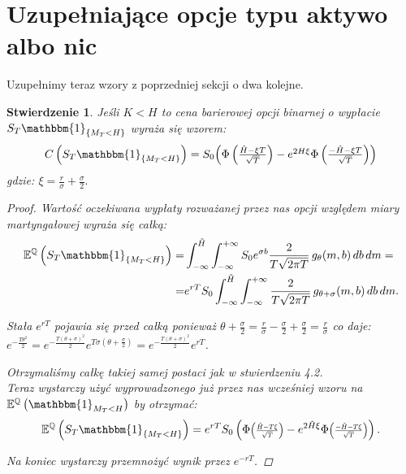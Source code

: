 \documentclass[11pt]{report}
\newtheorem{stw}{Stwierdzenie}[chapter]
\newcommand*{\Scale}[2][4]{\scalebox{#1}{$#2$}}%
\begin{document}
\section{Uzupełniające opcje typu aktywo albo nic}
Uzupełnimy teraz wzory z poprzedniej sekcji o dwa kolejne. 

\begin{stw} Jeśli $K < H$ to cena barierowej opcji binarnej o wypłacie $S_T\mathbbm{1}_{\{ M_T<H \}}$ wyraża się wzorem:
\begin{equation*}
C\left( S_T\mathbbm{1}_{\{ M_T<H \}} \right) = S_0 \Scale[1.0]{ \left(\Phi \left(\frac{ \tilde{H}-\xi T }{\sqrt{T}}\right) - e^{2H\xi}\Phi \left(\frac{ -\tilde{H}-\xi T }{\sqrt{T}}\right)\right) }
\end{equation*} gdzie: $\xi = \frac{r}{\sigma}+\frac{\sigma}{2}.$
\begin{proof}

Wartość oczekiwana wypłaty rozważanej przez nas opcji względem miary martyngałowej wyraża się całką:
\begin{multline*}
\begin{split}
\mathbb{E}^{\mathbb{Q}} \left( S_T\mathbbm{1}_{\{ M_T<H \}} \right) = & \int_{-\infty}^{\tilde{H}} \int_{-\infty}^{+\infty}S_0 e^{\sigma b}\frac{2}{T\sqrt{2\pi T}}\,g_{\theta}(m,b) \,db\,dm = \\ = & e^{rT }S_0\int_{-\infty}^{\tilde{H}} \int_{-\infty}^{+\infty} \frac{2}{T\sqrt{2\pi T}}\,g_{\theta+\sigma}(m,b) \,db\,dm.
\end{split}
\end{multline*}

Stała $e^{rT }$ pojawia się przed całką ponieważ $\theta + \frac{\sigma}{2}= \frac{r}{\sigma}-\frac{\sigma}{2} + \frac{\sigma}{2}= \frac{r}{\sigma}$ co daje: $e^{-\frac{T\theta^2}{2}} = e^{-\frac{T(\theta+\sigma)^2}{2}} e^{T\sigma(\theta +\frac{\sigma}{2})}  = e^{-\frac{T(\theta+\sigma)^2}{2}} e^{r T } $.
\vspace{0.5cm}

Otrzymaliśmy całkę takiej samej postaci jak w stwierdzeniu 4.2. \\
Teraz wystarczy użyć wyprowadzonego już przez nas wcześniej wzoru na 
$\mathbb{E}^{\mathbb{Q}}\left(\mathbbm{1}_{M_T < H} \right)$ by otrzymać:
\begin{equation*}
\mathbb{E}^{\mathbb{Q}} \left( S_T\mathbbm{1}_{\{ M_T<H \}} \right) = e^{rT }S_0 \left(\Phi \Scale[0.8]{\left(\frac{\tilde{H}-T\xi}{\sqrt{T}}\right)} - e^{2\tilde{H}\xi}\Phi \Scale[0.8]{\left(\frac{-\tilde{H}-T\xi}{\sqrt{T}}\right)}\right).
\end{equation*}


Na koniec wystarczy przemnożyć wynik przez $e^{-rT}$.

\end{proof}


\end{stw}
\end{document}
